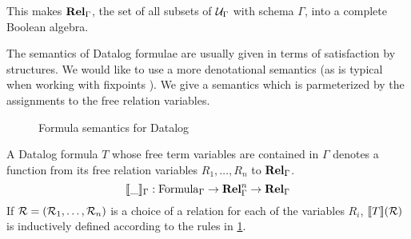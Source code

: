 This makes $\mathbf{Rel}_\Gamma$, the set of all subsets of $\mathcal{U}_\Gamma$ with schema $\Gamma$,
into a complete Boolean algebra.

The semantics of Datalog formulae are usually given in terms of satisfaction by
structures. We would like to use a more denotational semantics (as is typical
when working with fixpoints \autocite[see e.g.][]{compton1994stratified}). We give a semantics
which is parmeterized by the assignments to the free relation variables.

\begin{figure}
  \caption{Formula semantics for Datalog}
  \label{fig:datalogSemantics}
  \vspace{-12pt}
\end{figure}

\begin{defn}
  A Datalog formula $T$ whose free term variables are contained in $\Gamma$ denotes a function from 
  its free relation variables $R_1, \ldots, R_n$ 
  to $\mathbf{Rel}_\Gamma$.
  \begin{displaymath}
    \llbracket \_ \rrbracket_\Gamma : \mathrm{Formula}_\Gamma \rightarrow \mathbf{Rel}_\Gamma^n \rightarrow \mathbf{Rel}_\Gamma
  \end{displaymath}
  If $\mathcal{R} = (\mathcal{R}_1, \ldots, \mathcal{R}_n)$ is a choice of a relation for each of the variables $R_i$,
  $\llbracket T \rrbracket(\mathcal{R})$ is inductively defined according to the rules in \cref{fig:datalogSemantics}.
\end{defn}

